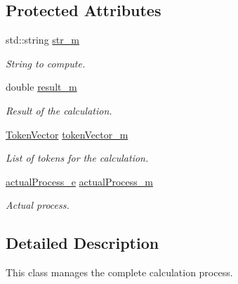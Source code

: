 \subsection*{Protected Attributes}
\begin{DoxyCompactItemize}
\item 
\hypertarget{class_analyze_a5eaf2648206b44a7136f00f6f2aea716}{}std\+::string \hyperlink{class_analyze_a5eaf2648206b44a7136f00f6f2aea716}{str\+\_\+m}\label{class_analyze_a5eaf2648206b44a7136f00f6f2aea716}

\begin{DoxyCompactList}\small\item\em String to compute. \end{DoxyCompactList}\item 
\hypertarget{class_analyze_ac5e2e04f7a6530205899bfc8089e6a1b}{}double \hyperlink{class_analyze_ac5e2e04f7a6530205899bfc8089e6a1b}{result\+\_\+m}\label{class_analyze_ac5e2e04f7a6530205899bfc8089e6a1b}

\begin{DoxyCompactList}\small\item\em Result of the calculation. \end{DoxyCompactList}\item 
\hypertarget{class_analyze_a0cb9f60bf517b50df90aa9669199f61c}{}\hyperlink{token_8h_ab47f31774188c3fad94acfd21e12c917}{Token\+Vector} \hyperlink{class_analyze_a0cb9f60bf517b50df90aa9669199f61c}{token\+Vector\+\_\+m}\label{class_analyze_a0cb9f60bf517b50df90aa9669199f61c}

\begin{DoxyCompactList}\small\item\em List of tokens for the calculation. \end{DoxyCompactList}\item 
\hypertarget{class_analyze_a41743a35d696fd86ab0e4af616a6cd9a}{}\hyperlink{class_analyze_aee7ac80c3a9b19650f0d3dd3bf8712d9}{actual\+Process\+\_\+e} \hyperlink{class_analyze_a41743a35d696fd86ab0e4af616a6cd9a}{actual\+Process\+\_\+m}\label{class_analyze_a41743a35d696fd86ab0e4af616a6cd9a}

\begin{DoxyCompactList}\small\item\em Actual process. \end{DoxyCompactList}\end{DoxyCompactItemize}


\subsection{Detailed Description}
This class manages the complete calculation process. 

